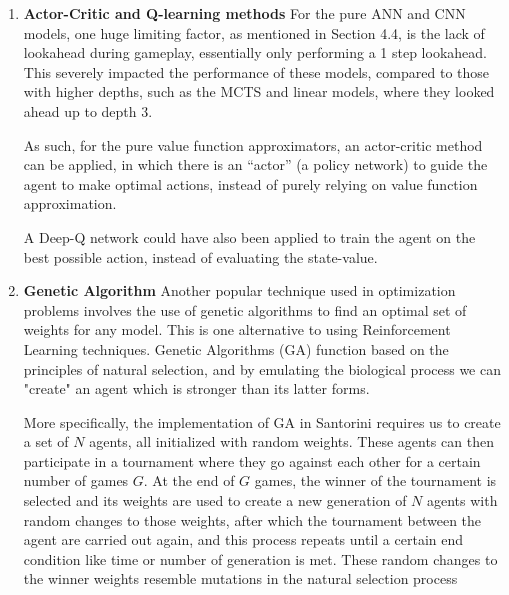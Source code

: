 \documentclass[a4paper,12pt,table]{article}
\begin{document}
\begin{enumerate}
    \item \textbf{Actor-Critic and Q-learning methods}
    \newline
    For the pure ANN and CNN models, one huge limiting factor, as mentioned in Section 4.4, is the lack of lookahead during gameplay, essentially only performing a 1 step lookahead. This severely impacted the performance of these models, compared to those with higher depths, such as the MCTS and linear models, where they looked ahead up to depth 3. \par

    As such, for the pure value function approximators, an actor-critic method can be applied, in which there is an “actor” (a policy network) to guide the agent to make optimal actions, instead of purely relying on value function approximation. \par

    A Deep-Q network could have also been applied to train the agent on the best possible action, instead of evaluating the state-value. \par

    \item \textbf{Genetic Algorithm}
    \newline
    Another popular technique used in optimization problems involves the use of genetic algorithms to find an optimal set of weights for any model. This is one alternative to using Reinforcement Learning techniques. Genetic Algorithms (GA) function based on the principles of natural selection, and by emulating the biological process we can "create" an agent which is stronger than its latter forms. \cite{Genetic algorithms: Concepts and Applications} \par

    More specifically, the implementation of GA in Santorini requires us to create a set of $N$ agents, all initialized with random weights. These agents can then participate in a tournament where they go against each other for a certain number of games $G$. At the end of $G$ games, the winner of the tournament is selected and its weights are used to create a new generation of $N$ agents with random changes to those weights, after which the tournament between the agent are carried out again, and this process repeats until a certain end condition like time or number of generation is met. These random changes to the winner weights resemble mutations in the natural selection process


\end{enumerate}
    
\end{document}
